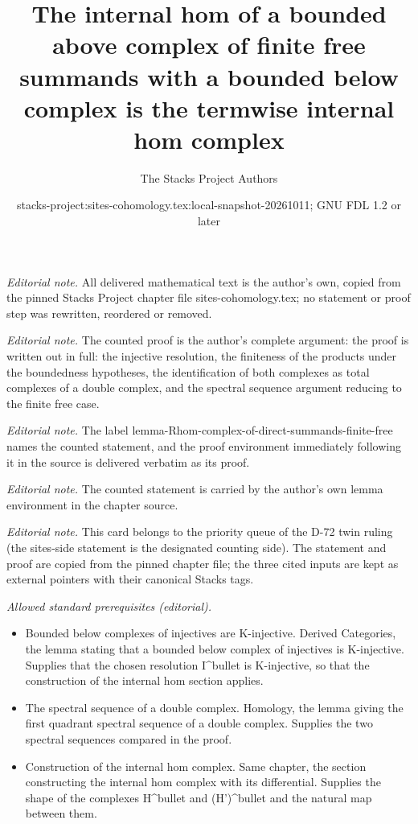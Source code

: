 \documentclass[10pt,a4paper]{amsart}
\title{The internal hom of a bounded above complex of finite free summands with a bounded below complex is the termwise internal hom complex}
\author{The Stacks Project Authors}
\date{stacks-project:sites-cohomology.tex:local-snapshot-20261011; GNU FDL 1.2 or later}
\theoremstyle{plain}
\theoremstyle{definition}
\theoremstyle{remark}
\numberwithin{equation}{subsection}
\begin{document}
\maketitle
\noindent\textit{Editorial note.} All delivered mathematical text is the author's own, copied from the pinned Stacks Project chapter file sites-cohomology.tex; no statement or proof step was rewritten, reordered or removed.\par\medskip
\noindent\textit{Editorial note.} The counted proof is the author's complete argument: the proof is written out in full: the injective resolution, the finiteness of the products under the boundedness hypotheses, the identification of both complexes as total complexes of a double complex, and the spectral sequence argument reducing to the finite free case.\par\medskip
\noindent\textit{Editorial note.} The label lemma-Rhom-complex-of-direct-summands-finite-free names the counted statement, and the proof environment immediately following it in the source is delivered verbatim as its proof.\par\medskip
\noindent\textit{Editorial note.} The counted statement is carried by the author's own lemma environment in the chapter source.\par\medskip
\noindent\textit{Editorial note.} This card belongs to the priority queue of the D-72 twin ruling (the sites-side statement is the designated counting side). The statement and proof are copied from the pinned chapter file; the three cited inputs are kept as external pointers with their canonical Stacks tags.\par\medskip
\noindent\textit{Allowed standard prerequisites (editorial).}\begin{itemize}
\item Bounded below complexes of injectives are K-injective. Derived Categories, the lemma stating that a bounded below complex of injectives is K-injective. Supplies that the chosen resolution I\textasciicircum{}bullet is K-injective, so that the construction of the internal hom section applies.
\item The spectral sequence of a double complex. Homology, the lemma giving the first quadrant spectral sequence of a double complex. Supplies the two spectral sequences compared in the proof.
\item Construction of the internal hom complex. Same chapter, the section constructing the internal hom complex with its differential. Supplies the shape of the complexes H\textasciicircum{}bullet and (H')\textasciicircum{}bullet and the natural map between them.
\end{itemize}\medskip
\end{document}
